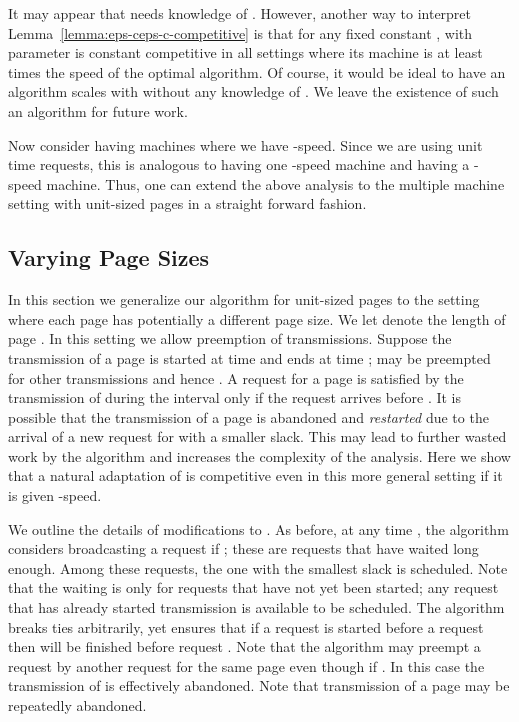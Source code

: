 \documentclass[11pt]{article}
\newtheorem{theorem}[lemma]{Theorem}
\newcommand{\lemref}[1]{Lemma~\ref{lemma:#1}}
\begin{document}
It may appear that  needs knowledge of . However, another
way to interpret \lemref{eps-ceps-c-competitive} is that for any fixed
constant ,  with parameter  is constant competitive in all
settings where its machine is at least  times the speed
of the optimal algorithm. Of course, it would be ideal to have an
algorithm scales with  without any knowledge of . We leave
the existence of such an algorithm for future work.

Now consider having  machines where we have -speed.
Since we are using unit time requests, this is analogous to 
having one -speed machine and  having a -speed machine.  Thus, one can extend the above analysis to
the multiple machine setting with unit-sized pages in a
straight forward fashion.

\iffalse
\begin{theorem}
For some constant ,  is a -speed -competitive algorithm for minimizing the maximum
delay factor in broadcast scheduling with unit-time requests with
 machines.
\end{theorem}
\fi

\subsection{Varying Page Sizes}
\label{subsec:varying}
In this section we generalize our algorithm for unit-sized pages to
the setting where each page has potentially a different page size. We
let  denote the length of page . In this setting we allow
preemption of transmissions. Suppose the transmission of a page  is
started at time  and ends at time ;  may be preempted for
other transmissions and hence .  A request for a page
 is satisfied by the transmission of  during the interval  only if the request arrives before . It is possible that
the transmission of a page  is abandoned and {\em restarted} due to
the arrival of a new request for  with a smaller slack.  This may
lead to further wasted work by the algorithm and increases the
complexity of the analysis. Here we show that a natural adaptation of
 is competitive even in this more general setting if it is given -speed.

We outline the details of modifications to . As before, at any time , the algorithm considers broadcasting a
request  if ; these are requests that have waited long
enough.  Among these requests, the one with the smallest slack is
scheduled. Note that the waiting is only for requests that have not
yet been started; any request that has already started transmission is
available to be scheduled.  The algorithm breaks ties arbitrarily, yet
ensures that if a request  is started before a request
 then  will be finished before request
. Note that the algorithm may preempt a request
 by another request  for the same page  even
though  if . In this case the
transmission of  is effectively abandoned. Note that
transmission of a page  may be repeatedly abandoned.
\end{document}
